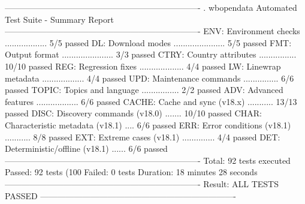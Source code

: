 ----------------------------------------------------------------------
. wbopendata Automated Test Suite - Summary Report
----------------------------------------------------------------------
  ENV:   Environment checks .................. 5/5 passed
  DL:    Download modes ...................... 5/5 passed
  FMT:   Output format ...................... 3/3 passed
  CTRY:  Country attributes ................ 10/10 passed
  REG:   Regression fixes ................... 4/4 passed
  LW:    Linewrap metadata .................. 4/4 passed
  UPD:   Maintenance commands ............... 6/6 passed
  TOPIC: Topics and language ................ 2/2 passed
  ADV:   Advanced features .................. 6/6 passed
  CACHE: Cache and sync (v18.x) ........... 13/13 passed
  DISC:  Discovery commands (v18.0) ....... 10/10 passed
  CHAR:  Characteristic metadata (v18.1) .... 6/6 passed
  ERR:   Error conditions (v18.1) ........... 8/8 passed
  EXT:   Extreme cases (v18.1) .............. 4/4 passed
  DET:   Deterministic/offline (v18.1) ...... 6/6 passed
----------------------------------------------------------------------
Total:    92 tests executed
Passed:   92 tests (100%
Failed:   0 tests
Duration: 18 minutes 28 seconds
----------------------------------------------------------------------
Result: ALL TESTS PASSED
----------------------------------------------------------------------
